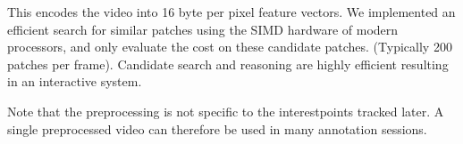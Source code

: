 \documentclass[landscape,final,fontscale=0.225,paperwidth=67.5in,paperheight=45in]{baposter}
\begin{document}
\begin{poster}
{\begin{multicols}{2}
This encodes the video into 16 byte per pixel feature vectors. We implemented
an efficient search for similar patches using the SIMD hardware of modern
processors, and only evaluate the cost on these candidate patches. (Typically
200 patches per frame). Candidate search and reasoning are highly efficient
resulting in an interactive system.

Note that the preprocessing is not specific to the interestpoints tracked
later. A single preprocessed video can therefore be used in many annotation
sessions.
\end{multicols}

   \vspace{0.3em}
  }

\end{poster}
\end{document}

